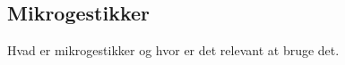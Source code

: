 \subsection{Mikrogestikker}
\label{Mikrogestikker}




Hvad er mikrogestikker og hvor er det relevant at bruge det. 